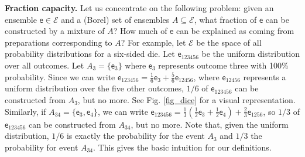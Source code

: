 \documentclass[10pt,twocolumn, nofootinbib]{revtex4-2}
\newcommand{\ens}[1][e] {\mathsf{#1}} %
\newcommand{\Ens}[1][E] {\mathcal{#1}} %
\begin{document}
\textbf{Fraction capacity.} Let us concentrate on the following problem: given an ensemble $\ens \in \Ens$ and a (Borel) set of ensembles $A \subseteq \Ens$, what fraction of $\ens$ can be constructed by a mixture of $A$? How much of $\ens$ can be explained as coming from preparations corresponding to $A$? For example, let $\Ens$ be the space of all probability distributions for a six-sided die. Let $\ens_{123456}$ be the uniform distribution over all outcomes. Let $A_3 = \{\ens_3\}$ where $\ens_3$ represents outcome three with 100\% probability. Since we can write $\ens_{123456} = \frac{1}{6} \ens_{3} + \frac{5}{6} \ens_{12456}$, where $\ens_{12456}$ represents a uniform distribution over the five other outcomes, $1/6$ of $\ens_{123456}$ can be constructed from $A_3$, but no more. See Fig. \ref{fig_dice} for a visual representation. Similarly, if $A_{34} = \{\ens_{3},\ens_{4}\}$, we can write $\ens_{123456} = \frac{1}{3} \left(\frac{1}{2} \ens_3 + \frac{1}{2} \ens_4 \right)  + \frac{2}{3} \ens_{1256}$, so $1/3$ of $\ens_{123456}$ can be constructed from $A_{34}$, but no more. Note that, given the uniform distribution, $1/6$ is exactly the probability for the event $A_3$ and $1/3$ the probability for event $A_{34}$. This gives the basic intuition for our definitions.
\end{document}
